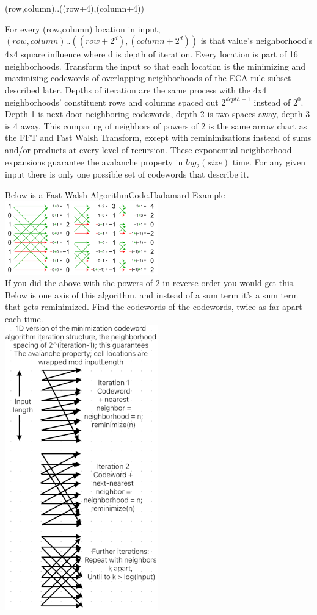 \documentclass[11pt]{article}
\begin{document}
\begin{center}
(row,column)..((row+4),(column+4))
\end{center}
For every (row,column) location in input, $(row,column)..((row+2^d),(column+2^d))$ is that value's neighborhood's 4x4 square influence where d is depth of iteration. Every location is part of 16 neighborhoods. Transform the input so that each location is the minimizing and maximizing codewords of overlapping neighborhoods of the ECA rule subset described later.  Depths of iteration are the same process with the 4x4 neighborhoods' constituent rows and columns spaced out $2^{depth-1}$ instead of $2^{0}$. Depth 1 is next door neighboring codewords, depth 2 is two spaces away, depth 3 is 4 away. This comparing of neighbors of powers of 2 is the same arrow chart as the FFT and Fast Walsh Transform, except with reminimizations instead of sums and/or products at every level of recursion. These exponential neighborhood expansions guarantee the avalanche property in $log_2(size)$ time. For any given input there is only one possible set of codewords that describe it.\\
\begin{center}
Below is a Fast Walsh-AlgorithmCode.Hadamard Example \cite{enwiki:1261916659}\\
\includegraphics{FastWalshHadamard}\\
If you did the above with the powers of 2 in reverse order you would get this. Below is one axis of this algorithm, and instead of a sum term it's a sum term that gets reminimized. Find the codewords of the codewords, twice as far apart each time.\\
\includegraphics{AlgoStruct}\\
\end{center}
\end{document}
